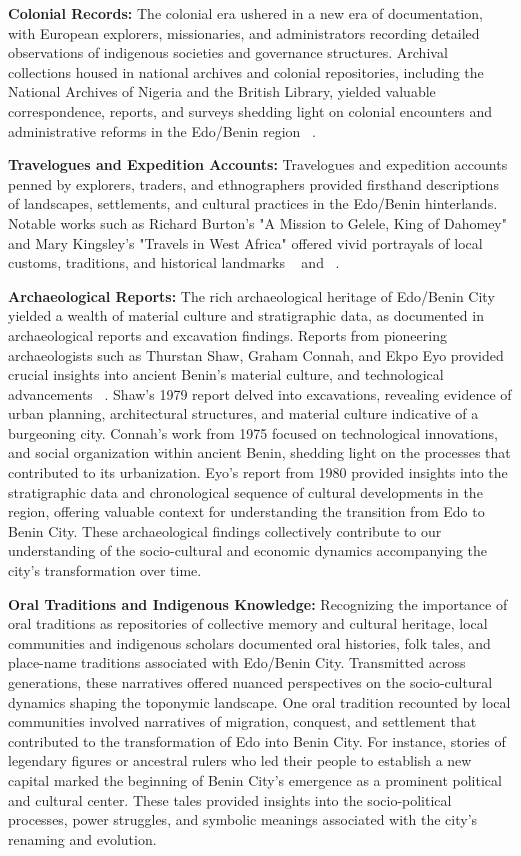 \textbf{Colonial Records:} The colonial era ushered in a new era of documentation, with European explorers, missionaries, and administrators recording detailed observations of indigenous societies and governance structures. Archival collections housed in national archives and colonial repositories, including the National Archives of Nigeria and the British Library, yielded valuable correspondence, reports, and surveys shedding light on colonial encounters and administrative reforms in the Edo/Benin region ~\cite{oliver1985}.

\textbf{Travelogues and Expedition Accounts:} Travelogues and expedition accounts penned by explorers, traders, and ethnographers provided firsthand descriptions of landscapes, settlements, and cultural practices in the Edo/Benin hinterlands. Notable works such as Richard Burton's "A Mission to Gelele, King of Dahomey" and Mary Kingsley's "Travels in West Africa" offered vivid portrayals of local customs, traditions, and historical landmarks ~\cite{burton2011} and ~\cite{kingsley1988}.

\textbf{Archaeological Reports:} The rich archaeological heritage of Edo/Benin City yielded a wealth of material culture and stratigraphic data, as documented in archaeological reports and excavation findings. Reports from pioneering archaeologists such as Thurstan Shaw, Graham Connah, and Ekpo Eyo provided crucial insights into ancient Benin's material culture, and technological advancements ~\cite{shaw1970,connah1975}. Shaw's 1979 report delved into excavations, revealing evidence of urban planning, architectural structures, and material culture indicative of a burgeoning city. Connah's work from 1975 focused on technological innovations, and social organization within ancient Benin, shedding light on the processes that contributed to its urbanization. Eyo's report from 1980 provided insights into the stratigraphic data and chronological sequence of cultural developments in the region, offering valuable context for understanding the transition from Edo to Benin City. These archaeological findings collectively contribute to our understanding of the socio-cultural and economic dynamics accompanying the city's transformation over time.

\textbf{Oral Traditions and Indigenous Knowledge:} Recognizing the importance of oral traditions as repositories of collective memory and cultural heritage, local communities and indigenous scholars documented oral histories, folk tales, and place-name traditions associated with Edo/Benin City. Transmitted across generations, these narratives offered nuanced perspectives on the socio-cultural dynamics shaping the toponymic landscape. One oral tradition recounted by local communities involved narratives of migration, conquest, and settlement that contributed to the transformation of Edo into Benin City. For instance, stories of legendary figures or ancestral rulers who led their people to establish a new capital marked the beginning of Benin City's emergence as a prominent political and cultural center. These tales provided insights into the socio-political processes, power struggles, and symbolic meanings associated with the city's renaming and evolution.

